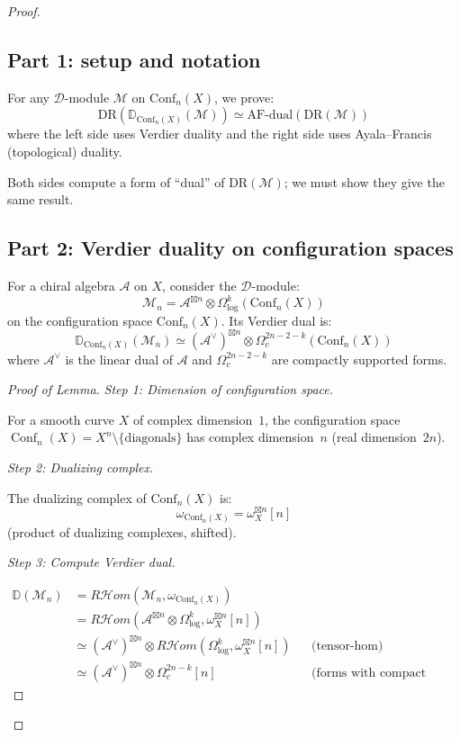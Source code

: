 \begin{proof}

\subsection*{Part 1: setup and notation}

For any $\mathcal{D}$-module $\mathcal{M}$ on $\mathrm{Conf}_n(X)$, we prove:
\[\text{DR}(\mathbb{D}_{\text{Conf}_n(X)}(\mathcal{M})) \simeq \text{AF-dual}(\text{DR}(\mathcal{M}))\]
where the left side uses Verdier duality and the right side uses Ayala--Francis (topological) duality.

Both sides compute a form of ``dual'' of $\text{DR}(\mathcal{M})$; we must show they give the same result.

\subsection*{Part 2: Verdier duality on configuration spaces}

\begin{lemma}\label{lem:verdier-dual-chiral}
For a chiral algebra $\mathcal{A}$ on $X$, consider the $\mathcal{D}$-module:
\[\mathcal{M}_n = \mathcal{A}^{\boxtimes n} \otimes \Omega^k_{\log}(\text{Conf}_n(X))\]
on the configuration space $\text{Conf}_n(X)$. Its Verdier dual is:
\[\mathbb{D}_{\text{Conf}_n(X)}(\mathcal{M}_n) \simeq (\mathcal{A}^\vee)^{\boxtimes n} \otimes \Omega^{2n-2-k}_c(\text{Conf}_n(X))\]
where $\mathcal{A}^\vee$ is the linear dual of $\mathcal{A}$ and $\Omega^{2n-2-k}_c$ are compactly supported forms.
\end{lemma}

\begin{proof}[Proof of Lemma]
\emph{Step 1: Dimension of configuration space.}

For a smooth curve $X$ of complex dimension~$1$, the configuration space $\operatorname{Conf}_n(X) = X^n \setminus \{\text{diagonals}\}$ has complex dimension~$n$ (real dimension~$2n$).

\emph{Step 2: Dualizing complex.}

The dualizing complex of $\text{Conf}_n(X)$ is:
\[\omega_{\text{Conf}_n(X)} = \omega_X^{\boxtimes n}[n]\]
(product of dualizing complexes, shifted).

\emph{Step 3: Compute Verdier dual.}

\begin{align*}
\mathbb{D}(\mathcal{M}_n) 
&= R\mathcal{H}om(\mathcal{M}_n, \omega_{\text{Conf}_n(X)}) \\
&= R\mathcal{H}om(\mathcal{A}^{\boxtimes n} \otimes \Omega^k_{\log}, \omega_X^{\boxtimes n}[n]) \\
&\simeq (\mathcal{A}^\vee)^{\boxtimes n} \otimes R\mathcal{H}om(\Omega^k_{\log}, \omega_X^{\boxtimes n}[n]) && \text{(tensor-hom)} \\
&\simeq (\mathcal{A}^\vee)^{\boxtimes n} \otimes \Omega^{2n-k}_c[n] && \text{(forms with compact support)}
\end{align*}


\end{proof}
\end{proof}
